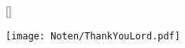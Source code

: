 []

\beginverse
\endverse
\texttt{[image: Noten/ThankYouLord.pdf]}

\endsong

\beginscripture{}~\\
\endscripture
